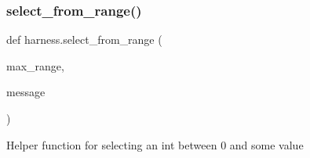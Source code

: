 \subsubsection{\texorpdfstring{select\+\_\+from\+\_\+range()}{select\_from\_range()}}
{\footnotesize\ttfamily def harness.\+select\+\_\+from\+\_\+range (\begin{DoxyParamCaption}\item[{}]{max\+\_\+range,  }\item[{}]{message }\end{DoxyParamCaption})}

\begin{DoxyVerb}Helper function for selecting an int between 0 and some value \end{DoxyVerb}
 